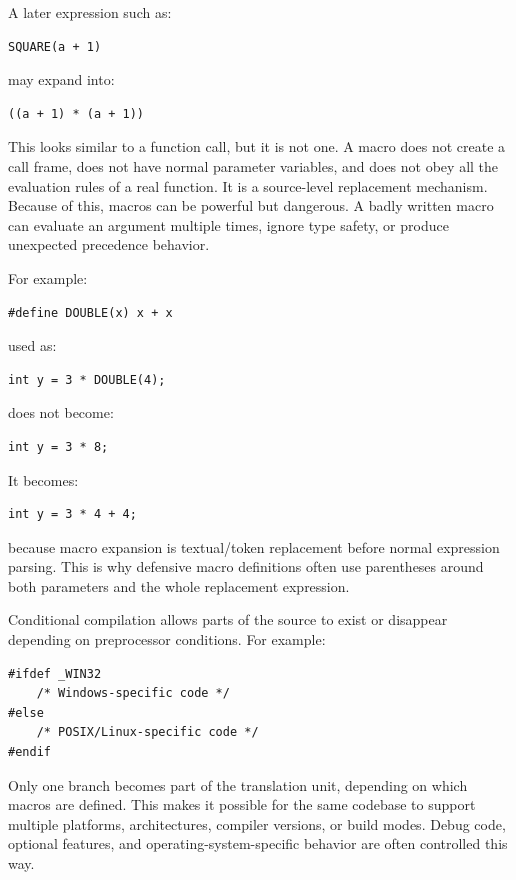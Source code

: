 A later expression such as:

\begin{verbatim}
SQUARE(a + 1)
\end{verbatim}

may expand into:

\begin{verbatim}
((a + 1) * (a + 1))
\end{verbatim}

This looks similar to a function call, but it is not one. A macro does not create a call frame, does not have normal parameter variables, and does not obey all the evaluation rules of a real function. It is a source-level replacement mechanism. Because of this, macros can be powerful but dangerous. A badly written macro can evaluate an argument multiple times, ignore type safety, or produce unexpected precedence behavior.

For example:

\begin{verbatim}
#define DOUBLE(x) x + x
\end{verbatim}

used as:

\begin{verbatim}
int y = 3 * DOUBLE(4);
\end{verbatim}

does not become:

\begin{verbatim}
int y = 3 * 8;
\end{verbatim}

It becomes:

\begin{verbatim}
int y = 3 * 4 + 4;
\end{verbatim}

because macro expansion is textual/token replacement before normal expression parsing. This is why defensive macro definitions often use parentheses around both parameters and the whole replacement expression.

Conditional compilation allows parts of the source to exist or disappear depending on preprocessor conditions. For example:

\begin{verbatim}
#ifdef _WIN32
    /* Windows-specific code */
#else
    /* POSIX/Linux-specific code */
#endif
\end{verbatim}

Only one branch becomes part of the translation unit, depending on which macros are defined. This makes it possible for the same codebase to support multiple platforms, architectures, compiler versions, or build modes. Debug code, optional features, and operating-system-specific behavior are often controlled this way.

